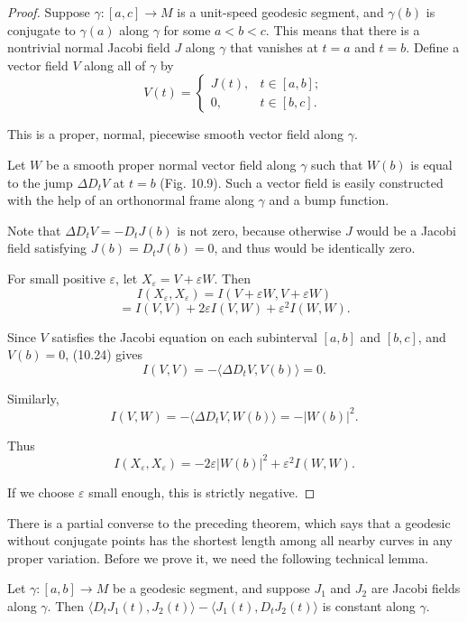 \begin{proof}
Suppose $\gamma: [a,c] \to M$ is a unit-speed geodesic segment, and $\gamma(b)$ is conjugate to $\gamma(a)$ along $\gamma$ for some $a < b < c$. This means that there is a nontrivial
normal Jacobi field $J$ along $\gamma$ that vanishes at $t = a$ and $t = b$. Define a vector field
$V$ along all of $\gamma$ by
\[
V(t) = \begin{cases} J(t), & t \in [a,b]; \\ 0, & t \in [b,c]. \end{cases}
\]

This is a proper, normal, piecewise smooth vector field along $\gamma$.

Let $W$ be a smooth proper normal vector field along $\gamma$ such that $W(b)$ is equal to
the jump $\Delta D_t V$ at $t = b$ (Fig. 10.9). Such a vector field is easily constructed with
the help of an orthonormal frame along $\gamma$ and a bump function.


Note that $\Delta D_t V =
-D_t J(b)$ is not zero, because otherwise $J$ would be a Jacobi field satisfying $J(b) =
D_t J(b) = 0$, and thus would be identically zero.

For small positive $\varepsilon$, let $X_\varepsilon = V + \varepsilon W$. Then
\[
I(X_\varepsilon, X_\varepsilon) = I(V + \varepsilon W, V + \varepsilon W)
\]
\[
= I(V,V) + 2\varepsilon I(V,W) + \varepsilon^2 I(W,W).
\]

Since $V$ satisfies the Jacobi equation on each subinterval $[a,b]$ and $[b,c]$, and
$V(b) = 0$, (10.24) gives
\[
I(V, V) = -\langle \Delta D_t V, V(b) \rangle = 0.
\]

Similarly,
\[
I(V, W) = -\langle \Delta D_t V, W(b) \rangle = -|W(b)|^2.
\]

Thus
\[
I(X_\varepsilon, X_\varepsilon) = -2\varepsilon |W(b)|^2 + \varepsilon^2 I(W, W).
\]

If we choose $\varepsilon$ small enough, this is strictly negative.
\end{proof}

There is a partial converse to the preceding theorem, which says that a geodesic without conjugate points has the shortest length among all nearby curves in any proper variation. Before we prove it, we need the following technical lemma.

\begin{lemma}\label{lem:jacobi-field-constant-pairing}
Let $\gamma : [a,b] \to M$ be a geodesic segment, and suppose $J_1$ and $J_2$ are Jacobi fields along $\gamma$. Then $\langle D_t J_1(t), J_2(t) \rangle - \langle J_1(t), D_t J_2(t) \rangle$ is constant along $\gamma$.
\end{lemma}


